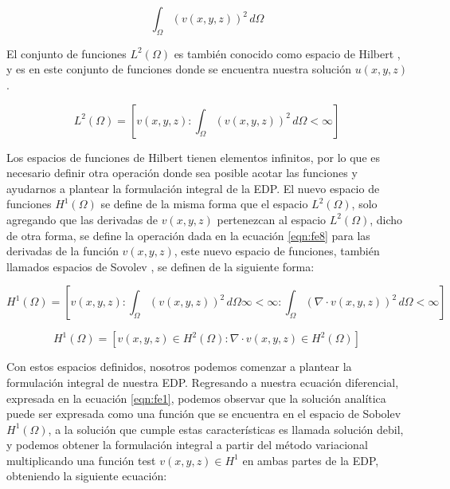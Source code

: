 \begin{equation}
\label{eqn:fe8}
 	 \displaystyle\int_{\Omega}^{} (v(x,y,z))^{2}\, d\Omega
\end{equation}

El conjunto de funciones $L^{2}(\Omega)$ es también conocido como espacio de Hilbert \cite{Esparza}, y es en este conjunto de funciones donde se encuentra nuestra solución $u(x,y,z)$.

\begin{equation}
\label{eqn:fe9}
  L^{2}(\Omega)=  \left[ v(x,y,z) : \displaystyle\int_{\Omega}^{} (v(x,y,z))^{2}\, d\Omega < \infty \right] 
\end{equation}

Los espacios de funciones de Hilbert tienen elementos infinitos, por lo que es necesario definir otra operación donde sea posible acotar las funciones y ayudarnos a plantear la formulación integral de la EDP. El nuevo espacio de funciones $H^{1}(\Omega)$ se define de la misma forma que el espacio $L^{2}(\Omega)$, solo agregando que las derivadas de $v(x,y,z)$ pertenezcan al espacio $L^{2}(\Omega)$, dicho de otra forma, se define la operación dada en la ecuación \ref{eqn:fe8} para las derivadas de la función $v(x,y,z)$, este nuevo espacio de funciones, también llamados espacios de Sovolev \cite{Whiteley2017}, se definen de la siguiente forma:

\begin{equation}
\label{eqn:fe10}
   H^{1}(\Omega)=  \left[ v(x,y,z):\displaystyle\int_{\Omega}^{} (v(x,y,z))^{2}\, d\Omega\infty < \infty : \displaystyle\int_{\Omega}^{} (\nabla{\cdot}v(x,y,z))^{2}\, d\Omega < \infty\right]  
\end{equation}

\begin{equation}
\label{eqn:fe11}
   H^{1}(\Omega)=  \left[ v(x,y,z)\in H^{2}(\Omega): \nabla{\cdot}v(x,y,z){\in} H^{2}(\Omega) \right]  
\end{equation}

Con estos espacios definidos, nosotros podemos comenzar a plantear la formulación integral de nuestra EDP. Regresando a nuestra ecuación diferencial, expresada en la ecuación \ref{eqn:fe1}, podemos observar que la solución analítica puede ser expresada como una función que se encuentra en el espacio de Sobolev $H^{1}(\Omega)$, a la solución que cumple estas características es llamada solución debil, y podemos obtener la formulación integral a partir del método variacional multiplicando una función test $v(x,y,z){\in}H^{1}$ en ambas partes de la EDP, obteniendo la siguiente ecuación:

